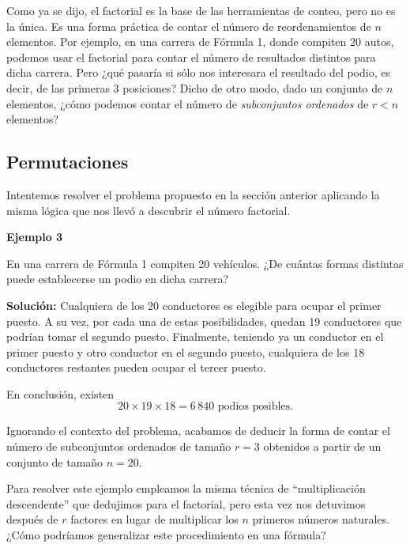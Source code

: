 \documentclass[
  letterpaper,
  DIV=11,
  numbers=noendperiod]{scrreprt}
\begin{document}
Como ya se dijo, el factorial es la base de las herramientas de conteo,
pero no es la única. Es una forma práctica de contar el número de
reordenamientos de \(n\) elementos. Por ejemplo, en una carrera de
Fórmula 1, donde compiten 20 autos, podemos usar el factorial para
contar el número de resultados distintos para dicha carrera. Pero ¿qué
pasaría si sólo nos interesara el resultado del podio, es decir, de las
primeras 3 posiciones? Dicho de otro modo, dado un conjunto de \(n\)
elementos, ¿cómo podemos contar el número de \emph{subconjuntos
ordenados} de \(r<n\) elementos?

\hypertarget{permutaciones}{%
\subsection{Permutaciones}\label{permutaciones}}

Intentemos resolver el problema propuesto en la sección anterior
aplicando la misma lógica que nos llevó a descubrir el número factorial.

\begin{examplebox}

\begin{center}
\textbf{Ejemplo 3}

\end{center}

En una carrera de Fórmula 1 compiten 20 vehículos. ¿De cuántas formas
distintas puede establecerse un podio en dicha carrera?

\textbf{Solución:} Cualquiera de los 20 conductores es elegible para
ocupar el primer puesto. A su vez, por cada una de estas posibilidades,
quedan 19 conductores que podrían tomar el segundo puesto. Finalmente,
teniendo ya un conductor en el primer puesto y otro conductor en el
segundo puesto, cualquiera de los 18 conductores restantes pueden ocupar
el tercer puesto.

En conclusión, existen
\[20 \times 19 \times 18 = 6\,840 \text{ podios posibles.}\]

\end{examplebox}

Ignorando el contexto del problema, acabamos de deducir la forma de
contar el número de subconjuntos ordenados de tamaño \(r=3\) obtenidos a
partir de un conjunto de tamaño \(n=20\).

Para resolver este ejemplo empleamos la misma técnica de
``multiplicación descendente'' que dedujimos para el factorial, pero
esta vez nos detuvimos después de \(r\) factores en lugar de multiplicar
los \(n\) primeros números naturales. ¿Cómo podríamos generalizar este
procedimiento en una fórmula?
\end{document}
